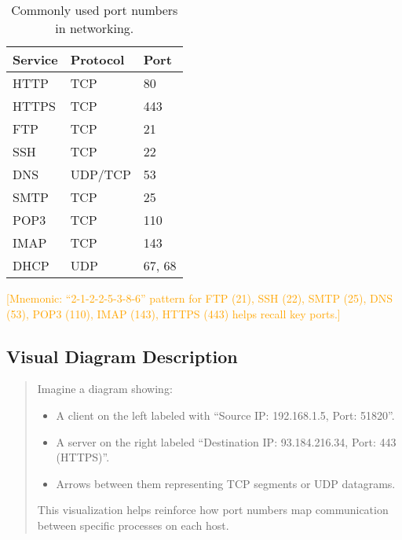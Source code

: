 \documentclass[12pt]{article}
\begin{document}
\begin{table}[h!]
    \centering
    \begin{tabular}{@{}lll@{}}
        \toprule
        \textbf{Service} & \textbf{Protocol} & \textbf{Port} \\ \midrule
        HTTP             & TCP               & 80            \\
        HTTPS            & TCP               & 443           \\
        FTP              & TCP               & 21            \\
        SSH              & TCP               & 22            \\
        DNS              & UDP/TCP           & 53            \\
        SMTP             & TCP               & 25            \\
        POP3             & TCP               & 110           \\
        IMAP             & TCP               & 143           \\
        DHCP             & UDP               & 67, 68        \\ \bottomrule
    \end{tabular}
    \caption{Commonly used port numbers in networking.}
\end{table}

\textcolor{orange}{[Mnemonic: ``2-1-2-2-5-3-8-6'' pattern for FTP (21), SSH (22), SMTP (25), DNS (53), POP3 (110), IMAP (143), HTTPS (443) helps recall key ports.]}

\subsection{Visual Diagram Description}
\begin{quote}
    Imagine a diagram showing:
    \begin{itemize}
        \item A client on the left labeled with ``Source IP: 192.168.1.5, Port: 51820''.
        \item A server on the right labeled ``Destination IP: 93.184.216.34, Port: 443 (HTTPS)''.
        \item Arrows between them representing TCP segments or UDP datagrams.
    \end{itemize}
    This visualization helps reinforce how port numbers map communication between specific processes on each host.
\end{quote}
\end{document}
